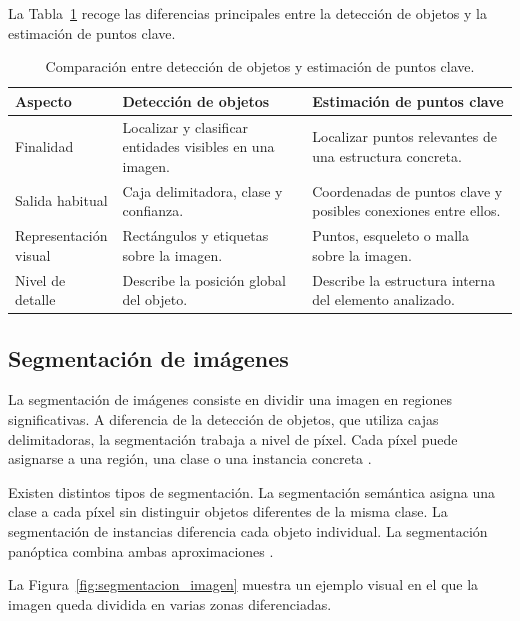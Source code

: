 La Tabla~\ref{tabla:deteccion-puntos-clave} recoge las diferencias principales entre la detección de objetos y la estimación de puntos clave.

\begin{table}[htbp]
	\centering
	\small
	\begin{tabular}{p{} p{} p{}}
		\toprule
		\textbf{Aspecto} & \textbf{Detección de objetos} & \textbf{Estimación de puntos clave} \\
		\midrule
		Finalidad & Localizar y clasificar entidades visibles en una imagen. & Localizar puntos relevantes de una estructura concreta. \\
		\midrule
		Salida habitual & Caja delimitadora, clase y confianza. & Coordenadas de puntos clave y posibles conexiones entre ellos. \\
		\midrule
		\shortstack[l]{Representación\\visual} & Rectángulos y etiquetas sobre la imagen. & Puntos, esqueleto o malla sobre la imagen. \\
		\midrule
		Nivel de detalle & Describe la posición global del objeto. & Describe la estructura interna del elemento analizado. \\
		\bottomrule
	\end{tabular}
	\caption[Comparación entre detección de objetos y puntos clave.]{Comparación entre detección de objetos y estimación de puntos clave.}
	\label{tabla:deteccion-puntos-clave}
\end{table}

\subsection{Segmentación de imágenes}

La segmentación de imágenes consiste en dividir una imagen en regiones significativas. A diferencia de la detección de objetos, que utiliza cajas delimitadoras, la segmentación trabaja a nivel de píxel. Cada píxel puede asignarse a una región, una clase o una instancia concreta \cite{gonzalez2018digital,szeliski2022computer}.

Existen distintos tipos de segmentación. La segmentación semántica asigna una clase a cada píxel sin distinguir objetos diferentes de la misma clase. La segmentación de instancias diferencia cada objeto individual. La segmentación panóptica combina ambas aproximaciones \cite{long2015fully,kirillov2019panoptic}.

La Figura~\ref{fig:segmentacion_imagen} muestra un ejemplo visual en el que la imagen queda dividida en varias zonas diferenciadas.

